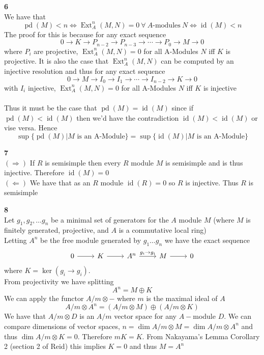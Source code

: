 \documentclass[12pt]{article}
\newenvironment{ques}[1]{\textbf{#1}\vspace{1 mm}\\ }{\bigskip}
\theoremstyle{definition}
\DeclareMathOperator\id{id}
\DeclareMathOperator\pd{pd}
\DeclareMathOperator\Ext{Ext}
\newcommand{\tensor}{\otimes}
\begin{document}
\begin{ques}{6}
	We have that 
	$$\pd(M) < n \Leftrightarrow \Ext^n_A(M,N) = 0\ \forall\ A\text{-modules}\
	N \Leftrightarrow \id(M) < n$$
	The proof for this is because for any exact sequence 
	$$0 \to K \to P_{n-2} \to P_{n-3} \to \cdots \to P_0 \to M \to 0$$
	where $P_i$ are projective, $\Ext^n_A(M,N) = 0$ for all A-Modules $N$ iff $K$ is
	projective. It is also the case that $\Ext^n_A(M,N)$ can be computed by an
	injective resolution and thus for any exact sequence
	$$0 \to M \to I_{0} \to I_{1} \to \cdots \to I_{n-2} \to K \to 0$$
	with $I_i$ injective, $\Ext^n_A(M,N) = 0$ for all A-Modules $N$ iff $K$ is
	injective
	\\
	\\
	Thus it must be the case that $\pd(M) = \id(M)$ since if $\pd(M) < \id(M)$
	then we'd have the contradiction $\id(M) < \id(M)$ or vise versa. Hence
	$$\sup\{\pd(M)|M \text{ is an A-Module}\} =
	\sup\{\id(M)|M \text{ is an A-Module}\}$$
\end{ques}

\begin{ques}{7}
	$(\Rightarrow)$ If $R$ is semisimple then every $R$ module $M$ is semisimple
	and is thus injective. Therefore $\id(M) = 0$\\
	$(\Leftarrow)$ We have that as an $R$ module $\id(R) = 0$ so $R$ is
	injective. Thus $R$ is semisimple
\end{ques}

\begin{ques}{8}
	Let $g_1, g_2, \dots g_n$ be a minimal set of generators for the $A$ module
	$M$ (where $M$ is finitely generated, projective, and $A$ is a commutative
	local ring)\\ Letting $A^n$ be the free module generated by $g_1 \dots g_n$
	we have the exact sequence
	$$\begin{tikzcd}
	0 \arrow[r] & K \arrow[r] & A^n \arrow[r, "g_i \to g_i"] &
	M \arrow[r] & 0
	\end{tikzcd}$$
	where $K = \ker(g_i \to g_i)$.\\
	From projectivity we have splitting
	$$A^n = M \oplus K$$
	We can apply the functor $A/m \tensor -$ where $m$ is the maximal ideal of $A$
	$$A/m \tensor A^n = (A/m \tensor M) \oplus (A/m \tensor K)$$
	We have that $A/m \tensor D$ is an $A/m$ vector space for any $A-$module
	$D$. We can compare dimensions of vector spaces, $n = \dim A/m \tensor M =
	\dim A/m \tensor A^n$ and thus $\dim A/m \tensor K = 0$. Therefore $mK =
	K$. From Nakayama's Lemma Corollary 2 (section 2 of Reid) this implies $K
	=0$ and thus $M = A^n$
\end{ques}
\end{document}
